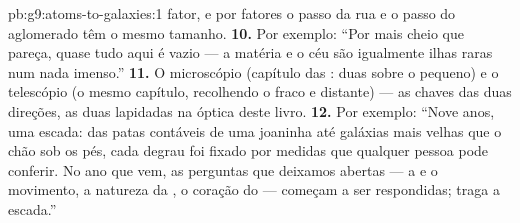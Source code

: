 \begin{solution}{pb:g9:atoms-to-galaxies:1}
fator, e por fatores o passo da rua e o passo do aglomerado têm o
mesmo tamanho.
\textbf{10.} Por exemplo: ``Por mais cheio que pareça, quase tudo
aqui é vazio --- a matéria e o céu são igualmente ilhas raras num
nada imenso.''
\textbf{11.} O microscópio (capítulo das : duas  sobre o pequeno) e o telescópio (o mesmo capítulo,
recolhendo o fraco e distante) --- as chaves das duas direções, as
duas lapidadas na óptica deste livro.
\textbf{12.} Por exemplo: ``Nove anos, uma escada: das patas
contáveis de uma joaninha até galáxias mais velhas que o chão sob os
pés, cada degrau foi fixado por medidas que qualquer pessoa pode
conferir. No ano que vem, as perguntas que deixamos abertas --- a
 e o movimento, a natureza da , o coração do  ---
começam a ser respondidas; traga a escada.''
\end{solution}
